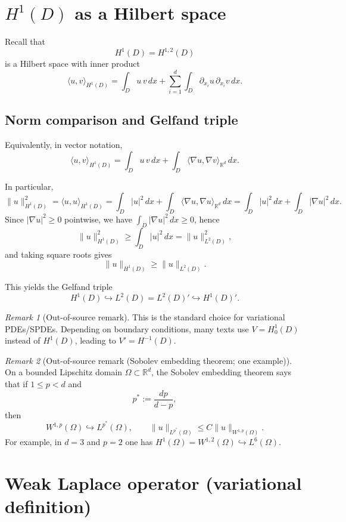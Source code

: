 \documentclass[11pt]{article}
\theoremstyle{definition}
\theoremstyle{remark}
\newtheorem{remark}{Remark}
\begin{document}
\section*{$H^1(D)$ as a Hilbert space}

Recall that
\[
H^1(D)=H^{1,2}(D)
\]
is a Hilbert space with inner product
\[
\langle u,v\rangle_{H^1(D)}
=
\int_D u\,v\,dx
+ \sum_{i=1}^{d}\int_D \partial_{x_i}u\,\partial_{x_i}v\,dx.
\]

\subsection*{Norm comparison and Gelfand triple}

Equivalently, in vector notation,
\[
\langle u,v\rangle_{H^1(D)}
=
\int_D u\,v\,dx
+ \int_D \langle \nabla u,\nabla v\rangle_{\mathbb{R}^d}\,dx.
\]

In particular,
\[
\|u\|_{H^1(D)}^2
=\langle u,u\rangle_{H^1(D)}
=\int_D |u|^2\,dx + \int_D \langle \nabla u,\nabla u\rangle_{\mathbb{R}^d}\,dx
=\int_D |u|^2\,dx + \int_D |\nabla u|^2\,dx.
\]
Since $|\nabla u|^2\ge 0$ pointwise, we have $\int_D |\nabla u|^2\,dx\ge 0$, hence
\[
\|u\|_{H^1(D)}^2 \ge \int_D |u|^2\,dx = \|u\|_{L^2(D)}^2,
\]
and taking square roots gives
\[
\|u\|_{H^1(D)} \ge \|u\|_{L^2(D)}.
\]

This yields the Gelfand triple
\[
H^1(D)\hookrightarrow L^2(D)=L^2(D)' \hookrightarrow H^1(D)'.
\]

\begin{remark}[Out-of-source remark]
This is the standard choice for variational PDEs/SPDEs. Depending on boundary conditions, many texts use $V=H_0^1(D)$ instead of $H^1(D)$, leading to $V'=H^{-1}(D)$.
\end{remark}

\begin{remark}[Out-of-source remark (Sobolev embedding theorem; one example)]
On a bounded Lipschitz domain $\Omega\subset\mathbb{R}^d$, the Sobolev embedding theorem says that if $1\le p<d$ and
\[
p^\ast:=\frac{dp}{d-p},
\]
then
\[
W^{1,p}(\Omega)\hookrightarrow L^{p^\ast}(\Omega),
\qquad
\|u\|_{L^{p^\ast}(\Omega)}\le C\|u\|_{W^{1,p}(\Omega)}.
\]
For example, in $d=3$ and $p=2$ one has $H^1(\Omega)=W^{1,2}(\Omega)\hookrightarrow L^6(\Omega)$.
\end{remark}

\section*{Weak Laplace operator (variational definition)}
\end{document}
